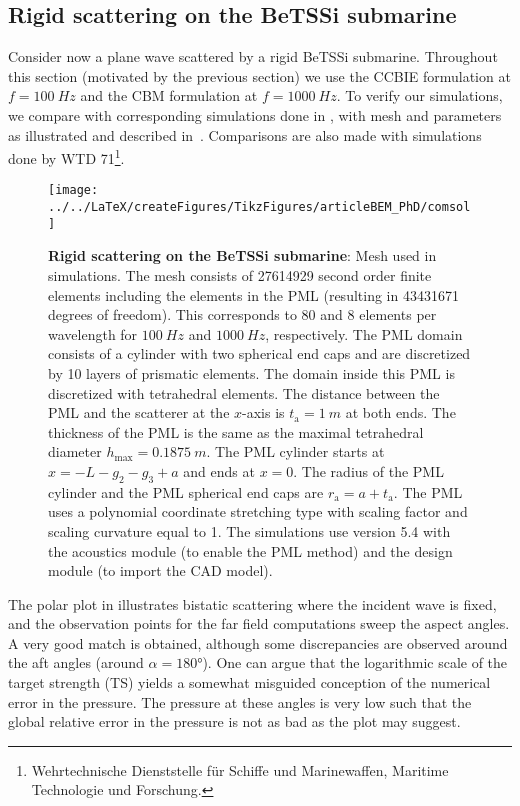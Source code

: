 \subsection{Rigid scattering on the BeTSSi submarine}
Consider now a plane wave scattered by a rigid BeTSSi submarine. Throughout this section (motivated by the previous section) we use the CCBIE formulation at $f=\SI{100}{Hz}$ and the CBM formulation at $f=\SI{1000}{Hz}$. To verify our simulations, we compare with corresponding simulations done in \COMSOL, with mesh and parameters as illustrated and described in~. Comparisons are also made with simulations done by WTD 71\footnote{Wehrtechnische Dienststelle f\"{u}r Schiffe und Marinewaffen, Maritime Technologie und Forschung.}.
\begin{figure}
	\centering
	\texttt{[image: ../../LaTeX/createFigures/TikzFigures/articleBEM\_PhD/comsol]}
	\caption{\textbf{Rigid scattering on the BeTSSi submarine}: Mesh used in \COMSOL simulations. The mesh consists of \num{27614929} second order finite elements including the elements in the PML (resulting in \num{43431671} degrees of freedom). This corresponds to 80 and 8 elements per wavelength for $\SI{100}{Hz}$ and $\SI{1000}{Hz}$, respectively.  The PML domain consists of a cylinder with two spherical end caps and are discretized by 10 layers of prismatic elements. The domain inside this PML is discretized with tetrahedral elements. The distance between the PML and the scatterer at the $x$-axis is $t_{\mathrm{a}}=\SI{1}{m}$ at both ends. The thickness of the PML is the same as the maximal tetrahedral diameter $h_{\mathrm{max}}=\SI{0.1875}{m}$. The PML cylinder starts at $x=-L-g_2-g_3+a$ and ends at $x=0$. The radius of the PML cylinder and the PML spherical end caps are $r_{\mathrm{a}} = a+t_{\mathrm{a}}$. The PML uses a polynomial coordinate stretching type with scaling factor and scaling curvature equal to 1. The simulations use \COMSOL version 5.4 with the acoustics module (to enable the PML method) and the design module (to import the CAD model).}
	\label{Fig3:COMSOL}
\end{figure}
The polar plot in  illustrates bistatic scattering where the incident wave is fixed, and the observation points for the far field computations sweep the aspect angles. A very good match is obtained, although some discrepancies are observed around the aft angles (around $\alpha=\ang{180}$). One can argue that the logarithmic scale of the target strength (TS) yields a somewhat misguided conception of the numerical error in the pressure. The pressure at these angles is very low such that the global relative error in the pressure is not as bad as the plot may suggest.
